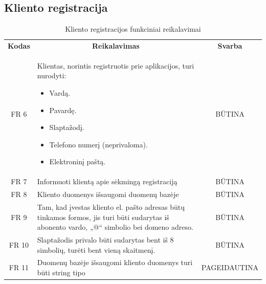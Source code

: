\documentclass{VUMIFPSkursinis}
\begin{document}
\subsection{Kliento registracija}
\begin{center}

	\begin{table}[H]
	\caption{Kliento registracijos funkciniai reikalavimai}
	\begin{tabular}{|p{2cm}|p{}|p{}|}
	\hline
	    \rowcolor{lightgray}
		\multicolumn{3}{|c|}{Kliento registracija}\\
		
	\hline
		\multicolumn{1}{|c|}{{\bfseries Kodas}}&
		\multicolumn{1}{|c|}{{\bfseries Reikalavimas}}&
		\multicolumn{1}{|c|}{{\bfseries Svarba}}\\

	\hline
	\multicolumn{1}{|c|}{FR 6}&
	{Klientas, norintis registruotis prie aplikacijos, turi nurodyti:
		\begin{itemize}
			\item Vardą.
			\item Pavardę.
			\item Slaptažodį.
			\item Telefono numerį (neprivaloma).
			\item Elektroninį paštą.
		\end{itemize}}&		
	\multicolumn{1}{|c|}{BŪTINA}\\
	\hline
	
		\multicolumn{1}{|c|}{FR 7}&
		{Informuoti klientą apie sėkmingą registraciją}&
		\multicolumn{1}{|c|}{BŪTINA}\\	
	\hline
		\multicolumn{1}{|c|}{FR 8}&
		{Kliento duomenys išsaugomi duomenų bazėje}&
		\multicolumn{1}{|c|}{BŪTINA}\\	
	\hline	
		\multicolumn{1}{|c|}{FR 9}&
		{Tam, kad įvestas kliento el. pašto adresas būtų tinkamos formos, jis turi būti sudarytas iš abonento vardo, „@“ simbolio bei domeno adreso.}&
		\multicolumn{1}{|c|}{BŪTINA}\\	
	\hline
		\multicolumn{1}{|c|}{FR 10}&
		{Slaptažodis privalo būti sudarytas bent iš 8 simbolių, turėti bent vieną skaitmenį.
}&
		\multicolumn{1}{|c|}{BŪTINA}\\		
	\hline
		\multicolumn{1}{|c|}{FR 11}&
		{Duomenų bazėje išsaugomi kliento duomenys turi būti string tipo }&
		\multicolumn{1}{|p{1.5cm}|}{PAGEIDAUTINA}\\		
	\hline
	
	\end{tabular}
	
	\label{table:VartotojoRegistracija}
	\end{table}

\end{center}
\end{document}
